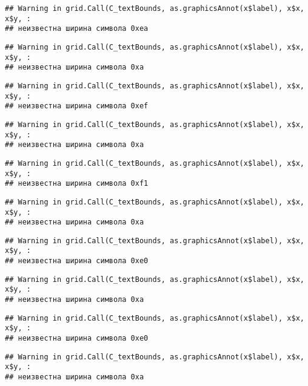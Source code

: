 \documentclass[
]{article}
\begin{document}
\begin{verbatim}
## Warning in grid.Call(C_textBounds, as.graphicsAnnot(x$label), x$x, x$y, :
## неизвестна ширина символа 0xea
\end{verbatim}

\begin{verbatim}
## Warning in grid.Call(C_textBounds, as.graphicsAnnot(x$label), x$x, x$y, :
## неизвестна ширина символа 0xa
\end{verbatim}

\begin{verbatim}
## Warning in grid.Call(C_textBounds, as.graphicsAnnot(x$label), x$x, x$y, :
## неизвестна ширина символа 0xef
\end{verbatim}

\begin{verbatim}
## Warning in grid.Call(C_textBounds, as.graphicsAnnot(x$label), x$x, x$y, :
## неизвестна ширина символа 0xa
\end{verbatim}

\begin{verbatim}
## Warning in grid.Call(C_textBounds, as.graphicsAnnot(x$label), x$x, x$y, :
## неизвестна ширина символа 0xf1
\end{verbatim}

\begin{verbatim}
## Warning in grid.Call(C_textBounds, as.graphicsAnnot(x$label), x$x, x$y, :
## неизвестна ширина символа 0xa
\end{verbatim}

\begin{verbatim}
## Warning in grid.Call(C_textBounds, as.graphicsAnnot(x$label), x$x, x$y, :
## неизвестна ширина символа 0xe0
\end{verbatim}

\begin{verbatim}
## Warning in grid.Call(C_textBounds, as.graphicsAnnot(x$label), x$x, x$y, :
## неизвестна ширина символа 0xa
\end{verbatim}

\begin{verbatim}
## Warning in grid.Call(C_textBounds, as.graphicsAnnot(x$label), x$x, x$y, :
## неизвестна ширина символа 0xe0
\end{verbatim}

\begin{verbatim}
## Warning in grid.Call(C_textBounds, as.graphicsAnnot(x$label), x$x, x$y, :
## неизвестна ширина символа 0xa
\end{verbatim}
\end{document}
